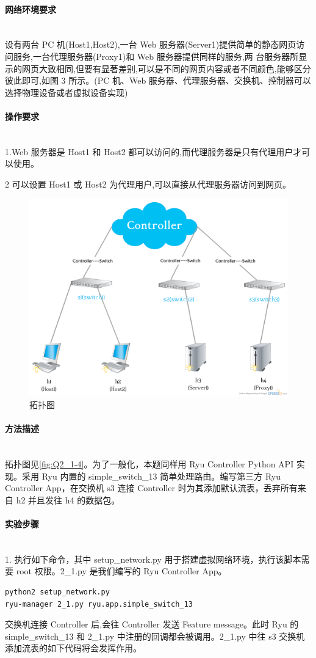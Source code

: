 \documentclass[format=draft,language=chinese,category=SDN]{hustreport}
\newcommand{\myparagraph}[1]{\paragraph{#1}\mbox{}\\}
\begin{document}
\myparagraph{网络环境要求}

设有两台 PC 机(Host1,Host2),一台 Web 服务器(Server1)提供简单的静态网页访问服务,一台代理服务器(Proxy1)和 Web 服务器提供同样的服务,两
台服务器所显示的网页大致相同,但要有显著差别,可以是不同的网页内容或者不同颜色,能够区分彼此即可,如图 3 所示。(PC 机、Web 服务器、代理服务器、交换机、控制器可以选择物理设备或者虚拟设备实现)

\myparagraph{操作要求}

1.Web 服务器是 Host1 和 Host2 都可以访问的,而代理服务器是只有代理用户才可以使用。

2 可以设置 Host1 或 Host2 为代理用户,可以直接从代理服务器访问到网页。

\begin{figure}[!h]
\centering
\includegraphics[width=.618\textwidth]{fig/2_1-4.png}
\caption{拓扑图}\label{fig:Q2_1-4}
\end{figure}

\myparagraph{方法描述}

拓扑图见\autoref{fig:Q2_1-4}。为了一般化，本题同样用 Ryu Controller Python API 实现。采用 Ryu 内置的 simple\_switch\_13 简单处理路由。编写第三方 Ryu Controller App，在交换机 s3 连接 Controller 时为其添加默认流表，丢弃所有来自 h2 并且发往 h4 的数据包。

\myparagraph{实验步骤}

1. 执行如下命令，其中 setup\_network.py 用于搭建虚拟网络环境，执行该脚本需要 root 权限。2\_1.py 是我们编写的 Ryu Controller App。

\begin{lstlisting}
python2 setup_network.py
ryu-manager 2_1.py ryu.app.simple_switch_13
\end{lstlisting}

交换机连接 Controller 后,会往 Controller 发送 Feature message。此时 Ryu 的 simple\_switch\_13 和 2\_1.py 中注册的回调都会被调用。2\_1.py 中往 s3 交换机添加流表的如下代码将会发挥作用。
\end{document}
